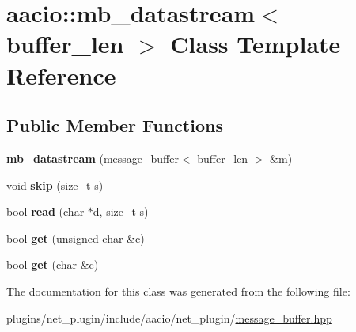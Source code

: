 \hypertarget{classaacio_1_1mb__datastream}{}\section{aacio\+:\+:mb\+\_\+datastream$<$ buffer\+\_\+len $>$ Class Template Reference}
\label{classaacio_1_1mb__datastream}
\subsection*{Public Member Functions}
\begin{DoxyCompactItemize}
\item 
\mbox{\label{classaacio_1_1mb__datastream_a365712bd04385d28c056c46fb87827ae}} 
{\bfseries mb\+\_\+datastream} (\mbox{\hyperlink{classaacio_1_1message__buffer}{message\+\_\+buffer}}$<$ buffer\+\_\+len $>$ \&m)
\item 
\mbox{\label{classaacio_1_1mb__datastream_aa58d277cedc79db122c07c6d783a724a}} 
void {\bfseries skip} (size\+\_\+t s)
\item 
\mbox{\label{classaacio_1_1mb__datastream_a9f5fe6a538e7702c7be75214601301c9}} 
bool {\bfseries read} (char $\ast$d, size\+\_\+t s)
\item 
\mbox{\label{classaacio_1_1mb__datastream_a3b543a4c37f903acaec73088e5f46a6a}} 
bool {\bfseries get} (unsigned char \&c)
\item 
\mbox{\label{classaacio_1_1mb__datastream_a3d831b83bf74f7e335fe6433bc08bc8a}} 
bool {\bfseries get} (char \&c)
\end{DoxyCompactItemize}


The documentation for this class was generated from the following file\+:\begin{DoxyCompactItemize}
\item 
plugins/net\+\_\+plugin/include/aacio/net\+\_\+plugin/\mbox{\hyperlink{message__buffer_8hpp}{message\+\_\+buffer.\+hpp}}\end{DoxyCompactItemize}
